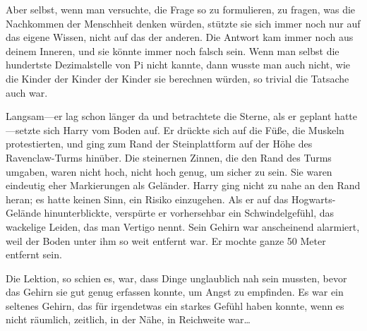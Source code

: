 Aber selbst, wenn man versuchte, die Frage so zu formulieren, zu fragen, was die Nachkommen der Menschheit denken würden, stützte sie sich immer noch nur auf das eigene Wissen, nicht auf das der anderen. Die Antwort kam immer noch aus deinem Inneren, und sie könnte immer noch falsch sein. Wenn man selbst die hundertste Dezimalstelle von Pi nicht kannte, dann wusste man auch nicht, wie die Kinder der Kinder der Kinder sie berechnen würden, so trivial die Tatsache auch war.

\later

Langsam—er lag schon länger da und betrachtete die Sterne, als er geplant hatte—setzte sich Harry vom Boden auf. Er drückte sich auf die Füße, die Muskeln protestierten, und ging zum Rand der Steinplattform auf der Höhe des Ravenclaw-Turms hinüber. Die steinernen Zinnen, die den Rand des Turms umgaben, waren nicht hoch, nicht hoch genug, um sicher zu sein. Sie waren eindeutig eher Markierungen als Geländer. Harry ging nicht zu nahe an den Rand heran; es hatte keinen Sinn, ein Risiko einzugehen. Als er auf das Hogwarts-Gelände hinunterblickte, verspürte er vorhersehbar ein Schwindelgefühl, das wackelige Leiden, das man Vertigo nennt. Sein Gehirn war anscheinend alarmiert, weil der Boden unter ihm so weit entfernt war. Er mochte ganze 50 Meter entfernt sein.

Die Lektion, so schien es, war, dass Dinge unglaublich nah sein mussten, bevor das Gehirn sie gut genug erfassen konnte, um Angst zu empfinden.
Es war ein seltenes Gehirn, das für irgendetwas ein starkes Gefühl haben konnte, wenn es nicht räumlich, zeitlich, in der Nähe, in Reichweite war…

